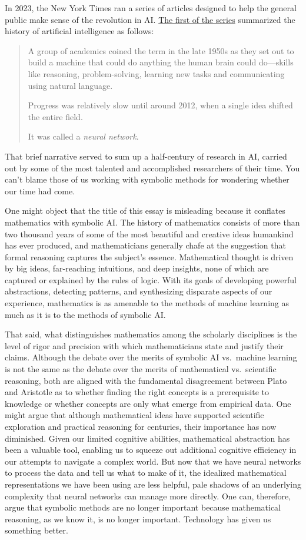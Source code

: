 \documentclass[11pt]{article}
\begin{document}
In 2023, the New York Times ran a series of articles designed to help the general public make sense of the revolution in AI. \href{nytimes.com/article/ai-artificial-intelligence-chatbot.html}{The first of the series} summarized the history of artificial intelligence as follows:
\begin{quote}
 A group of academics coined the term in the late 1950s as they set out to build a machine that could do anything the human brain could do---skills like reasoning, problem-solving, learning new tasks and communicating using natural language.

 Progress was relatively slow until around 2012, when a single idea shifted the entire field.

 It was called a \emph{neural network}.
\end{quote}
That brief narrative served to sum up a half-century of research in AI, carried out by some of the most talented and accomplished researchers of their time. You can't blame those of us working with symbolic methods for wondering whether our time had come.

One might object that the title of this essay is misleading because it conflates mathematics with symbolic AI. The history of mathematics consists of more than two thousand years of some of the most beautiful and creative ideas humankind has ever produced, and mathematicians generally chafe at the suggestion that formal reasoning captures the subject's essence. Mathematical thought is driven by big ideas, far-reaching intuitions, and deep insights, none of which are captured or explained by the rules of logic. With its goals of developing powerful abstractions, detecting patterns, and synthesizing disparate aspects of our experience, mathematics is as amenable to the methods of machine learning as much as it is to the methods of symbolic AI.

That said, what distinguishes mathematics among the scholarly disciplines is the level of rigor and precision with which mathematicians state and justify their claims. Although the debate over the merits of symbolic AI vs.~machine learning is not the same as the debate over the merits of mathematical vs.~scientific reasoning, both are aligned with the fundamental disagreement between Plato and Aristotle as to whether finding the right concepts is a prerequisite to knowledge or whether concepts are only what emerge from empirical data. One might argue that although mathematical ideas have supported scientific exploration and practical reasoning for centuries, their importance has now diminished. Given our limited cognitive abilities, mathematical abstraction has been a valuable tool, enabling us to squeeze out additional cognitive efficiency in our attempts to navigate a complex world. But now that we have neural networks to process the data and tell us what to make of it, the idealized mathematical representations we have been using are less helpful, pale shadows of an underlying complexity that neural networks can manage more directly. One can, therefore, argue that symbolic methods are no longer important because mathematical reasoning, as we know it, is no longer important. Technology has given us something better.
\end{document}
